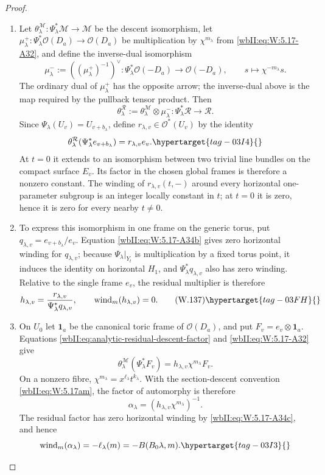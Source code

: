 \begin{proof}
\begin{enumerate}[label=\arabic*.,leftmargin=*]
\item Let
\(\theta^{\mathcal M}_\lambda:\Psi_\lambda^*\mathcal M\to\mathcal M\)
be the descent isomorphism, let
\(\mu^+_\lambda:\Psi_\lambda^*\mathcal O(D_a)\to\mathcal O(D_a)\)
be multiplication by \(\chi^{m_\lambda}\) from \eqref{wbII:eq:W:5.17-A32}, and define the
inverse-dual isomorphism
\[
 \mu^-_\lambda:=((\mu^+_\lambda)^{-1})^\vee:
 \Psi_\lambda^*\mathcal O(-D_a)\longrightarrow\mathcal O(-D_a),
 \qquad s\longmapsto\chi^{-m_\lambda}s.
\]
The ordinary dual of \(\mu^+_\lambda\) has the opposite arrow; the
inverse-dual above is the map required by the pullback tensor product.  Then
\[
 \theta^{\mathcal R}_\lambda
 :=\theta^{\mathcal M}_\lambda\otimes\mu^-_\lambda:
 \Psi_\lambda^*\mathcal R\longrightarrow\mathcal R.
\]
Since \(\Psi_\lambda(U_v)=U_{v+b_\lambda}\), define
\(r_{\lambda,v}\in\mathcal O^*(U_v)\) by the identity
\begin{equation}
 \theta^{\mathcal R}_\lambda
   (\Psi_\lambda^*e_{v+b_\lambda})
 =r_{\lambda,v}e_v.
\hypertarget{tag-03I4}{}\label{wbII:eq:analytic-residual-descent-factor}
\end{equation}
At \(t=0\) it extends to an isomorphism between two trivial line bundles
on the compact surface \(E_v\).  Its factor in the chosen global frames is
therefore a nonzero constant.  The winding of
\(r_{\lambda,v}(t,-)\) around every horizontal one-parameter subgroup is
an integer locally constant in \(t\); at \(t=0\) it is zero, hence it is
zero for every nearby \(t\ne0\).

\item To express this isomorphism in one frame on the generic torus, put
\(q_{\lambda,v}=e_{v+b_\lambda}/e_v\).  Equation \eqref{wbII:eq:W:5.17-A34b} gives zero
horizontal winding for \(q_{\lambda,v}\); because
\(\Psi_\lambda|_{Y_t}\) is multiplication by a fixed torus point, it
induces the identity on horizontal \(H_1\), and
\(\Psi_\lambda^*q_{\lambda,v}\) also has zero winding.  Relative to the
single frame \(e_v\), the residual multiplier is therefore
\[
 h_{\lambda,v}
 =\frac{r_{\lambda,v}}{\Psi_\lambda^*q_{\lambda,v}},
 \qquad
 \operatorname{wind}_m(h_{\lambda,v})=0.
\tag{W.137}\hypertarget{tag-03FH}{}\label{wbII:eq:W:5.17-A34c}
\]

\item On \(U_0\) let \(\mathbf1_a\) be the canonical toric frame of
\(\mathcal O(D_a)\), and put \(F_v=e_v\otimes\mathbf1_a\).  Equations
\cref{wbII:eq:analytic-residual-descent-factor} and \eqref{wbII:eq:W:5.17-A32} give
\[
 \theta^{\mathcal M}_\lambda(\Psi_\lambda^*F_v)
 =h_{\lambda,v}\chi^{m_\lambda}F_v.
\]
On a nonzero fibre, \(\chi^{m_\lambda}=x^{\ell_\lambda}t^{k_\lambda}\).
With the section-descent convention \eqref{wbII:eq:W:5.17am}, the factor of automorphy is
therefore
\[
 \alpha_\lambda=(h_{\lambda,v}\chi^{m_\lambda})^{-1}.
\]
The residual factor has zero horizontal winding by \eqref{wbII:eq:W:5.17-A34c}, and hence
\begin{equation}
 \operatorname{wind}_m(\alpha_\lambda)
 =-\ell_\lambda(m)=-B(B_0\lambda,m).
\hypertarget{tag-03I3}{}\label{wbII:eq:analytic-factor-horizontal-winding}
\end{equation}


\end{enumerate}
\end{proof}
